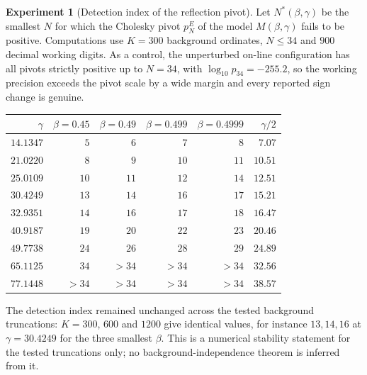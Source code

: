 \documentclass[11pt]{amsart}
\numberwithin{equation}{section}
\theoremstyle{plain}
\theoremstyle{definition}
\newtheorem{experiment}[theorem]{Experiment}
\theoremstyle{remark}
\begin{document}
\begin{experiment}[Detection index of the reflection pivot]
\label{exp:detection_index}
Let $N^*(\beta,\gamma)$ be the smallest $N$ for which the Cholesky pivot $p_N^E$ of the
model $M(\beta,\gamma)$ fails to be positive.  Computations use $K=300$ background
ordinates, $N\le34$ and $900$ decimal working digits.  As a control, the unperturbed
on-line configuration has all pivots strictly positive up to $N=34$, with
$\log_{10}p_{34}=-255.2$, so the working precision exceeds the pivot scale by a wide
margin and every reported sign change is genuine.
\begin{center}
\small
\begin{tabular}{rrrrrr}
\toprule
$\gamma$ & $\beta=0.45$ & $\beta=0.49$ & $\beta=0.499$ & $\beta=0.4999$ & $\gamma/2$\\
\midrule
$14.1347$ & $5$  & $6$  & $7$  & $8$  & $7.07$\\
$21.0220$ & $8$  & $9$  & $10$ & $11$ & $10.51$\\
$25.0109$ & $10$ & $11$ & $12$ & $14$ & $12.51$\\
$30.4249$ & $13$ & $14$ & $16$ & $17$ & $15.21$\\
$32.9351$ & $14$ & $16$ & $17$ & $18$ & $16.47$\\
$40.9187$ & $19$ & $20$ & $22$ & $23$ & $20.46$\\
$49.7738$ & $24$ & $26$ & $28$ & $29$ & $24.89$\\
$65.1125$ & $34$ & $>34$ & $>34$ & $>34$ & $32.56$\\
$77.1448$ & $>34$ & $>34$ & $>34$ & $>34$ & $38.57$\\
\bottomrule
\end{tabular}
\end{center}
The detection index remained unchanged across the tested background truncations: $K=300$, $600$ and $1200$ give
identical values, for instance $13,14,16$ at $\gamma=30.4249$ for the three smallest
$\beta$.  This is a numerical stability statement for the tested truncations only; no
background-independence theorem is inferred from it.


\end{experiment}
\end{document}
